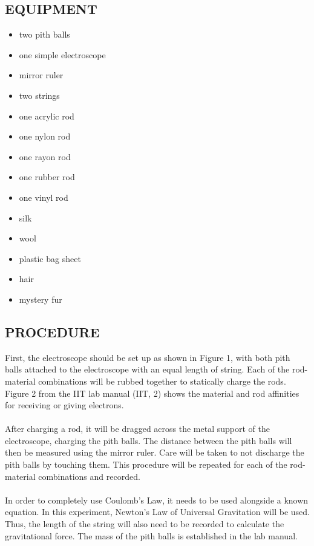 \documentclass [12pt, letterpaper, twoside] {article}
\begin{document}
\subsection* {EQUIPMENT}
  \noindent
  \begin {itemize}
    \itemsep0em
    \item {two pith balls}
    \item {one simple electroscope}
    \item {mirror ruler}
    \item {two strings}
    \item {one acrylic rod}
    \item {one nylon rod}
    \item {one rayon rod}
    \item {one rubber rod}
    \item {one vinyl rod}
    \item {silk}
    \item {wool}
    \item {plastic bag sheet}
    \item {hair}
    \item {mystery fur}
  \end {itemize}

\subsection* {PROCEDURE}
First, the electroscope should be set up as shown in Figure 1, with both pith balls attached to the electroscope with an equal length of string. Each of the rod-material combinations will be rubbed together to statically charge the rods. Figure 2 from the IIT lab manual (IIT, 2) shows the material and rod affinities for receiving or giving electrons. \\\\
After charging a rod, it will be dragged across the metal support of the electroscope, charging the pith balls. The distance between the pith balls will then be measured using the mirror ruler. Care will be taken to not discharge the pith balls by touching them. This procedure will be repeated for each of the rod-material combinations and recorded. \\\\
In order to completely use Coulomb's Law, it needs to be used alongside a known equation. In this experiment, Newton's Law of Universal Gravitation will be used. Thus, the length of the string will also need to be recorded to calculate the gravitational force. The mass of the pith balls is established in the lab manual.
\end{document}
